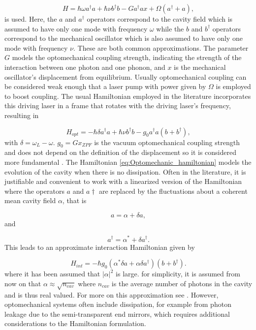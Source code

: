 \documentclass[12pt]{article}
\begin{document}
\begin{equation}\label{eq:basic_hamiltonian}
    H=\hbar \omega a^\dagger a + \hbar\nu b^\dagger b - G a^\dagger a x+ \Omega(a^\dagger+a),
\end{equation}  is used. Here, the $a$ and $a^\dagger$ operators correspond to the cavity field which is assumed to have only one mode with frequency $\omega$ while the $b$ and $b^\dagger$ operators correspond to the mechanical oscillator which is also assumed to have only one mode with frequency $\nu$. These are both common approximations.  The parameter $G$ models the optomechanical coupling strength, indicating the strength of the interaction between one photon and one phonon, and $x$ is the mechanical oscillator's displacement from equilibrium.  Usually optomechanical coupling can be considered weak enough that a laser pump with power given by $\Omega$ is employed to boost coupling. The usual Hamiltonian employed in the literature incorporates this driving laser in a frame that rotates with the driving laser's frequency, resulting in

\begin{equation}\label{eq:Optomechanic_hamiltonian}
    H_{opt}=-\hbar \delta a^\dagger a + \hbar\nu b^\dagger b - g_0 a^\dagger a (b+b^\dagger) ,
\end{equation} with $\delta = \omega_L-\omega$. $g_0 = G x_{ZPF}$ is the vacuum optomechanical coupling strength and does not depend on the definition of the displacement so it is considered more fundamental \cite{AspelmeyerOptomechanics2014}. The Hamiltonian \eqref{eq:Optomechanic_hamiltonian} models the evolution of the cavity when there is no dissipation. Often in the literature, it is justifiable and convenient to work with a linearized version of the Hamiltonian where the operators $a$ and $a\dagger$ are replaced by the fluctuations about a coherent mean cavity field $\alpha$, that is

\begin{equation}
    a = \alpha + \delta a,
\end{equation} and

\begin{equation}
    a^\dagger = \alpha^* + \delta a^\dagger.
\end{equation} This leads to an approximate interaction Hamiltonian given by

\begin{equation}
    H_{int} = -\hbar g_0 (\alpha^* \delta a + \alpha \delta a^\dagger)(b+b^\dagger).
\end{equation} where it has been assumed that $|\alpha|^2$ is large. for simplicity, it is assumed from now on that $\alpha \approx \sqrt{n_{cav}}$ where $n_{cav}$ is the average number of photons in the cavity and is thus real valued. For more on this approximation see \cite{AspelmeyerOptomechanics2014}. However, optomechanical systems often include dissipation, for example from photon leakage due to the semi-transparent end mirrors, which requires additional considerations to the Hamiltonian formulation.
\end{document}
